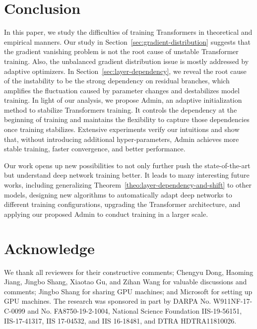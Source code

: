 \documentclass[11pt,a4paper]{article}
\newcommand{\our}{\mbox{Admin}\xspace}
\begin{document}
\section{Conclusion}

In this paper, we study the difficulties of training Transformers in theoretical and empirical manners. 
Our study in Section~\ref{sec:gradient-distribution} suggests that the gradient vanishing problem is not the root cause of unstable Transformer training. 
Also, the unbalanced gradient distribution issue is mostly addressed by adaptive optimizers. 
In Section~\ref{sec:layer-dependency}, we reveal the root cause of the instability to be the strong dependency on residual branches, which amplifies the fluctuation caused by parameter changes and destabilizes model training. 
In light of our analysis, we propose \our, an adaptive initialization method to stabilize Transformers training. 
It controls the dependency at the beginning of training and maintains the flexibility to capture those dependencies once training stabilizes. 
Extensive experiments verify our intuitions and show that, without introducing additional hyper-parameters, \our achieves more stable training, faster convergence, and better performance. 

Our work opens up new possibilities to not only further push the state-of-the-art but understand deep network training better. 
It leads to many interesting future works, including generalizing Theorem~\ref{theo:layer-dependency-and-shift} to other models, designing new algorithms to automatically adapt deep networks to different training configurations, upgrading the Transformer architecture, and applying our proposed \our to conduct training in a larger scale.
 

\section*{Acknowledge}
We thank all reviewers for their constructive comments; Chengyu Dong, Haoming Jiang, Jingbo Shang, Xiaotao Gu, and Zihan Wang for valuable discussions and comments; Jingbo Shang for sharing GPU machines; and Microsoft for setting up GPU machines.
The research was sponsored in part by DARPA No. W911NF-17-C-0099 and No.  FA8750-19-2-1004, National Science Foundation IIS-19-56151, IIS-17-41317, IIS 17-04532, and IIS 16-18481, and DTRA HDTRA11810026.
 



\onecolumn
\appendix
\appendixpage
\end{document}
